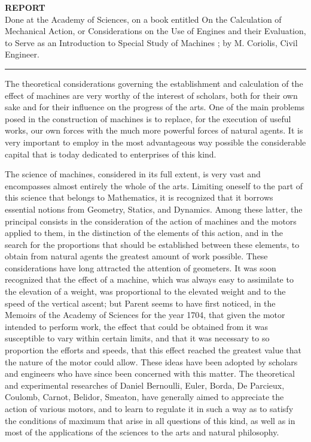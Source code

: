 \documentclass{book}
\begin{document}
\newpage
{}
\textbf{REPORT}
\begingroup
\centering 
\\
Done at the Academy of Sciences, on a book entitled On the Calculation of 
Mechanical Action, or Considerations on the Use of Engines and their Evaluation, to Serve as an Introduction to Special Study of Machines ; by M. Coriolis, Civil Engineer. 
\par\noindent\rule{\textwidth}{1pt}
 \endgroup
\setlength{\parindent}{20pt}
The theoretical considerations governing the establishment and calculation of the effect of machines are very worthy of the interest of scholars, both for their own sake and for their influence on the progress of the arts. One of the main problems posed in the construction of machines is to replace, for the execution of useful works, our own forces with the much more powerful forces of natural agents. It is very important to employ in the most advantageous way possible the considerable capital that is today dedicated to enterprises of this kind.

The science of machines, considered in its full extent, is very vast and encompasses almost entirely the whole of the arts. Limiting oneself to the part of this science that belongs to Mathematics, it is recognized that it borrows essential notions from Geometry, Statics, and Dynamics. Among these latter, the principal consists in the consideration of the action of machines and the motors applied to them, in the distinction of the elements of this action, and in the search for the proportions that should be established between these elements, to obtain from natural agents the greatest amount of work possible. These considerations have long attracted the attention of geometers. It was soon recognized that the effect of a machine, which was always easy to assimilate to the elevation of a weight, was proportional to the elevated weight and to the speed of the vertical ascent; but Parent seems to have first noticed, in the Memoirs of the Academy of Sciences for the year 1704, that given the motor intended to perform work, the effect that could be obtained from it was susceptible to vary within certain limits, and that it was necessary to so proportion the efforts and speeds, that this effect reached the greatest value that the nature of the motor could allow. These ideas have been adopted by scholars and engineers who have since been concerned with this matter. The theoretical and experimental researches of Daniel Bernoulli, Euler, Borda, De Parcieux, Coulomb, Carnot, Belidor, Smeaton, have generally aimed to appreciate the action of various motors, and to learn to regulate it in such a way as to satisfy the conditions of maximum that arise in all questions of this kind, as well as in most of the applications of the sciences to the arts and natural philosophy.
\end{document}
